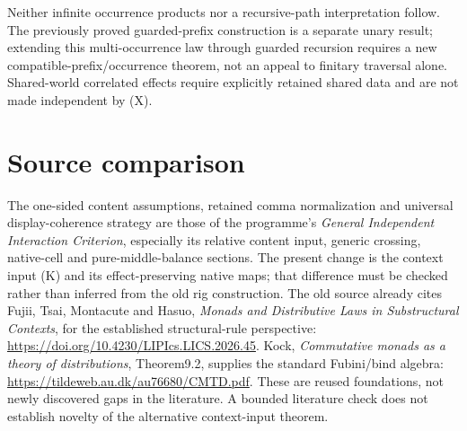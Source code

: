 \documentclass[11pt]{article}
\begin{document}
Neither infinite occurrence products nor a recursive-path interpretation follow. The previously proved guarded-prefix construction is a separate unary result; extending this multi-occurrence law through guarded recursion requires a new compatible-prefix/occurrence theorem, not an appeal to finitary traversal alone. Shared-world correlated effects require explicitly retained shared data and are not made independent by (X).
\section*{Source comparison}
The one-sided content assumptions, retained comma normalization and universal display-coherence strategy are those of the programme's \emph{General Independent Interaction Criterion}, especially its relative content input, generic crossing, native-cell and pure-middle-balance sections. The present change is the context input (K) and its effect-preserving native maps; that difference must be checked rather than inferred from the old rig construction. The old source already cites Fujii, Tsai, Montacute and Hasuo, \emph{Monads and Distributive Laws in Substructural Contexts}, for the established structural-rule perspective: \url{https://doi.org/10.4230/LIPIcs.LICS.2026.45}. Kock, \emph{Commutative monads as a theory of distributions}, Theorem9.2, supplies the standard Fubini/bind algebra: \url{https://tildeweb.au.dk/au76680/CMTD.pdf}. These are reused foundations, not newly discovered gaps in the literature. A bounded literature check does not establish novelty of the alternative context-input theorem.
\end{document}
